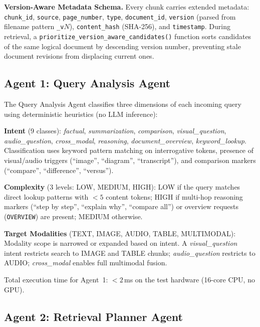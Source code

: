 \documentclass[conference]{IEEEtran}
\begin{document}
\textbf{Version-Aware Metadata Schema.} Every chunk carries extended
metadata: \texttt{chunk\_id}, \texttt{source}, \texttt{page\_number},
\texttt{type}, \texttt{document\_id}, \texttt{version} (parsed from filename
pattern \texttt{\_v$N$}), \texttt{content\_hash} (SHA-256), and
\texttt{timestamp}. During retrieval, a \texttt{prioritize\_version\_aware\_candidates()}
function sorts candidates of the same logical document by descending version
number, preventing stale document revisions from displacing current ones.

\subsection{Agent 1: Query Analysis Agent}
\label{subsec:agent1}

The Query Analysis Agent classifies three dimensions of each incoming query
using deterministic heuristics (no LLM inference):

\textbf{Intent} (9 classes): \textit{factual}, \textit{summarization},
\textit{comparison}, \textit{visual\_question}, \textit{audio\_question},
\textit{cross\_modal}, \textit{reasoning}, \textit{document\_overview},
\textit{keyword\_lookup}. Classification uses keyword pattern matching on
interrogative tokens, presence of visual/audio triggers (``image'',
``diagram'', ``transcript''), and comparison markers (``compare'',
``difference'', ``versus'').

\textbf{Complexity} (3 levels: LOW, MEDIUM, HIGH): LOW if the query matches
direct lookup patterns with $<\!5$ content tokens; HIGH if multi-hop
reasoning markers (``step by step'', ``explain why'', ``compare all'') or
overview requests (\texttt{OVERVIEW}) are present; MEDIUM otherwise.

\textbf{Target Modalities} (TEXT, IMAGE, AUDIO, TABLE, MULTIMODAL):
Modality scope is narrowed or expanded based on intent. A
\textit{visual\_question} intent restricts search to IMAGE and TABLE chunks;
\textit{audio\_question} restricts to AUDIO; \textit{cross\_modal} enables
full multimodal fusion.

Total execution time for Agent~1: $<\!2$\,ms on the test hardware (16-core
CPU, no GPU).

\subsection{Agent 2: Retrieval Planner Agent}
\label{subsec:agent2}
\end{document}
